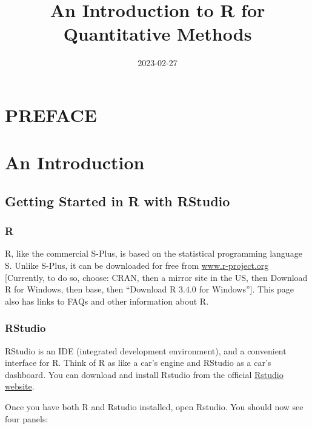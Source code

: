 \documentclass[
]{book}
\title{An Introduction to R for Quantitative Methods}
\author{}
\date{\vspace{-2.5em}2023-02-27}
\begin{document}
\maketitle

{
\setcounter{tocdepth}{1}
\tableofcontents
}
\hypertarget{preface}{%
\chapter*{PREFACE}\label{preface}}

\hypertarget{an-introduction}{%
\chapter{An Introduction}\label{an-introduction}}

\hypertarget{getting-started-in-r-with-rstudio}{%
\section*{Getting Started in R with RStudio}\label{getting-started-in-r-with-rstudio}}

\hypertarget{r}{%
\subsection*{R}\label{r}}

R, like the commercial S-Plus, is based on the statistical programming language S. Unlike S-Plus, it can be downloaded for free from \url{www.r-project.org} {[}Currently, to do so, choose: CRAN, then a mirror site in the US, then Download R for Windows, then base, then ``Download R 3.4.0 for Windows''{]}. This page also has links to FAQs and other information about R.

\hypertarget{rstudio}{%
\subsection*{RStudio}\label{rstudio}}

RStudio is an IDE (integrated development environment), and a convenient interface for R. Think of R as like a car's engine and RStudio as a car's dashboard. You can download and install Rstudio from the official \href{https://rstudio.com/products/rstudio/download/}{Rstudio website}.

Once you have both R and Rstudio installed, open Rstudio. You should now see four panels:
\end{document}
